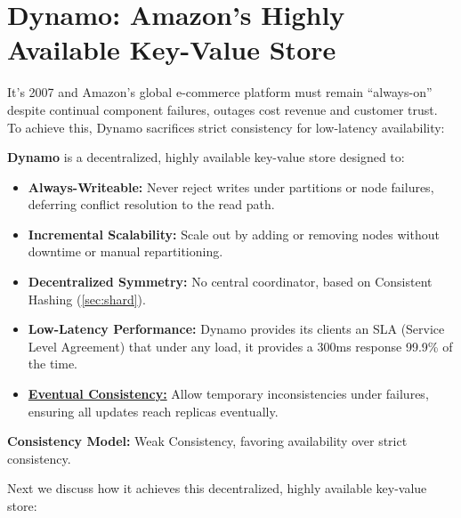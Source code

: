 \newpage

\section{Dynamo: Amazon's Highly Available Key-Value Store}

It's 2007 and Amazon's global e-commerce platform must remain ``always-on'' despite continual component failures, outages cost revenue and customer trust. To achieve this, Dynamo sacrifices strict consistency for low-latency availability:

\begin{Def}
    \textbf{Dynamo} is a decentralized, highly available key-value store designed to:
    \begin{itemize}
      \item \textbf{Always-Writeable:} Never reject writes under partitions or node failures, deferring conflict resolution to the read path.
      \item \textbf{Incremental Scalability:} Scale out by adding or removing nodes without downtime or manual repartitioning.
      \item \textbf{Decentralized Symmetry:} No central coordinator, based on Consistent Hashing (\ref{sec:shard}).
      \item \textbf{Low-Latency Performance:} Dynamo provides its clients an SLA (Service Level Agreement) that under any load, it provides 
      a 300ms response 99.9\% of the time.
      \item \underline{\textbf{Eventual Consistency:}} Allow temporary inconsistencies under failures, ensuring all updates reach replicas eventually.
    \end{itemize}
    \noindent
    \textbf{Consistency Model:} Weak Consistency, favoring availability over strict consistency.
  \end{Def}
  

  \noindent
  Next we discuss how it achieves this decentralized, highly available key-value store:

